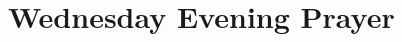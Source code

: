 
\null\medskip{%
\parindent 0pt
\noindent
\ifx\preLilyPondExample \undefined
\else
  \expandafter\preLilyPondExample
\fi
\def\lilypondbook{}%

\ifx\postLilyPondExample \undefined
\else
  \expandafter\postLilyPondExample
\fi
}

\newpage


\section{Wednesday Evening Prayer}

{%
\parindent 0pt
\noindent
\ifx\preLilyPondExample \undefined
\else
  \expandafter\preLilyPondExample
\fi
\def\lilypondbook{}%

\ifx\postLilyPondExample \undefined
\else
  \expandafter\postLilyPondExample
\fi
}


\null\medskip{%
\parindent 0pt
\noindent
\ifx\preLilyPondExample \undefined
\else
  \expandafter\preLilyPondExample
\fi
\def\lilypondbook{}%

\ifx\postLilyPondExample \undefined
\else
  \expandafter\postLilyPondExample
\fi
}

\newpage

{%
\parindent 0pt
\noindent
\ifx\preLilyPondExample \undefined
\else
  \expandafter\preLilyPondExample
\fi
\def\lilypondbook{}%

\ifx\postLilyPondExample \undefined
\else
  \expandafter\postLilyPondExample
\fi
}


\null\medskip{%
\parindent 0pt
\noindent
\ifx\preLilyPondExample \undefined
\else
  \expandafter\preLilyPondExample
\fi
\def\lilypondbook{}%

\ifx\postLilyPondExample \undefined
\else
  \expandafter\postLilyPondExample
\fi
}

\newpage
\null\newpage

{%
\parindent 0pt
\noindent
\ifx\preLilyPondExample \undefined
\else
  \expandafter\preLilyPondExample
\fi
\def\lilypondbook{}%

\ifx\postLilyPondExample \undefined
\else
  \expandafter\postLilyPondExample
\fi
}

